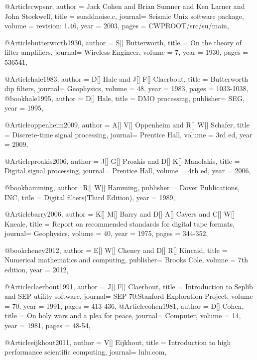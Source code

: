 @Article{cwpsnr,
  author = 	 {Jack Cohen and Brian Sumner and Ken Larner and John Stockwell},
  title  = 	 {suaddnoise.c},
  journal= 	 {Seismic Unix software package},
  volume =	 {revision: 1.46},
  year   = 	 2003,
  pages  =	 {CWPROOT/src/su/main},
}

@Article{butterworth1930,
  author = 	 {S[] Butterworth},
  title  = 	 {On the theory of filter amplifiers},
  journal= 	 {Wireless Engineer},
  volume =	 {7},
  year   = 	 1930,
  pages  =	 {536541},
}

@Article{hale1983,
  author = 	 {D[] Hale and J[] F[] Claerbout},
  title  = 	 {Butterworth dip filters},
  journal= 	 {Geophysics},
  volume =	 {48},
  year   = 	 1983,
  pages  =	 {1033-1038},
}
@book{hale1995,
  author = 	 {D[] Hale},
  title  = 	 {DMO processing},
  publisher= 	 {SEG},
  year   = 	 1995,
}

@Article{oppenheim2009,
  author = 	 {A[] V[] Oppenheim and R[] W[] Schafer},
  title  = 	 {Discrete-time signal processing},
  journal= 	 {Prentice Hall},
  volume =	 {3rd ed},
  year   = 	 2009,
}

@Article{proakis2006,
  author = 	 {J[] G[] Proakis and D[] K[] Manolakis},
  title  = 	 {Digital signal processing},
  journal= 	 {Prentice Hall},
  volume =	 {4th ed},
  year   = 	 2006,
}

@book{hamming,
  author={R[] W[] Hamming},
  publisher = {Dover Publications, INC},
  title = {Digital filters(Third Edition)},
  year = {1989},
}

@Article{barry2006,
  author = 	 {K[] M[] Barry and D[] A[] Cavers and C[] W[] Kneale},
  title  = 	 {Report on recommended standards for digital tape formats},
  journal= 	 {Geophysics},
  volume =	 {40},
  year   = 	 1975,
  pages  = 	 344-352,
}

@book{cheney2012,
  author = 	 {E[] W[] Cheney and D[] R[] Kincaid},
  title  = 	 {Numerical mathematics and computing},
  publisher= 	 {Brooks Cole},
  volume =	 {7th edition},
  year   = 	 2012,
}

@Article{claerbout1991,
  author = 	 {J[] F[] Claerbout},
  title  = 	 {Introduction to Seplib and SEP utility software},
  journal= 	 {SEP-70:Stanford Exploration Project},
  volume =	 {70},
  year   = 	 1991,
  pages  =	 413-436,
}
@Article{cohen1981,
  author = 	 {D[] Cohen},
  title  = 	 {On holy wars and a plea for peace},
  journal= 	 {Computer},
  volume =	 {14},
  year   = 	 1981,
  pages  =   	 48-54,
}

@Article{eijkhout2011,
  author = 	 {V[] Eijkhout},
  title  = 	 {Introduction to high performance scientific computing},
  journal= 	 {lulu.com},
}

